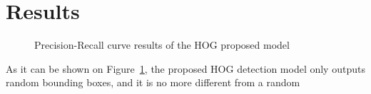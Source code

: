 \documentclass[10pt,twocolumn,letterpaper]{article}
\begin{document}
\section{Results}
\begin{figure}[H]
		\centering
		\caption{Precision-Recall curve results of the HOG proposed model}
		\label{Fig:PR}
\end{figure}


As it can be shown on Figure~\ref{Fig:PR}, the proposed HOG detection model only outputs random bounding boxes, and it is no more different from a random 

{\small


}


\newpage
%
%
%
%
%
\end{document}
